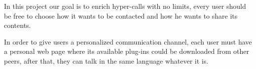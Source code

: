   In this project our goal is to enrich hyper-calls with no limits, every user should be free to choose how it wants to be contacted and how he wants to share its contents.
  
  In order to give users a personalized communication channel, each user must have a personal web page where its available plug-ins could be downloaded from other peers, after that, they can talk in the same language whatever it is.
